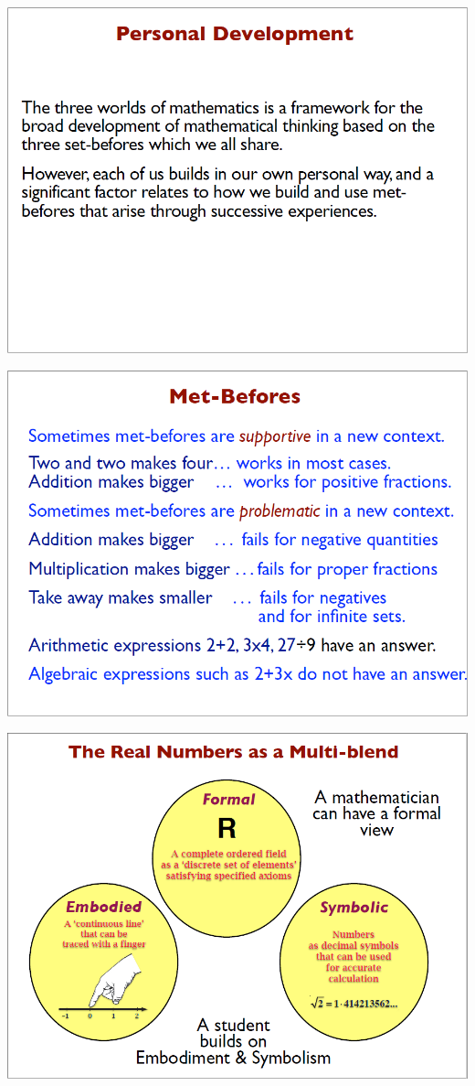 \documentclass{article}
\begin{document}
\begin{minipage}[t]{0.32\linewidth}
	\includegraphics[width=1\textwidth]{david_tall/dt11.png}%
	
	\includegraphics[width=1\textwidth]{david_tall/dt14.png}%
	
	\includegraphics[width=1\textwidth]{david_tall/dt17.png}%
\end{minipage}
\end{document}
